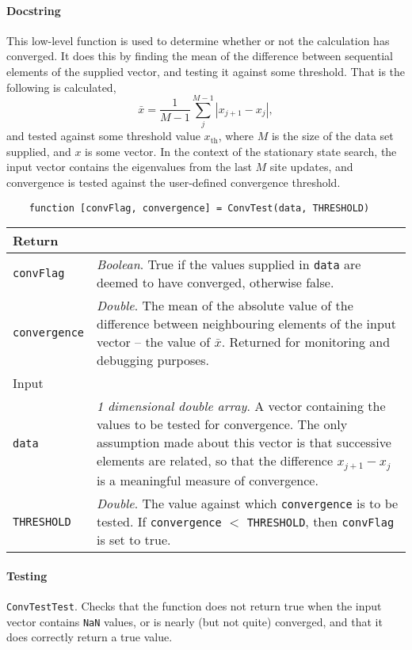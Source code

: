  \paragraph{Docstring} This low-level function is used to determine whether or not the calculation has converged. It does this by finding the mean of the difference between sequential elements of the supplied vector, and testing it against some threshold. That is the following is calculated, 
 \begin{equation}
 	\bar{x} = \frac{1}{M-1} \sum_{j}^{M-1} | x_{j+1} - x_{j} |,
 \end{equation}
 and tested against some threshold value \(x_{\mathrm{th}}\), where \(M\) is the size of the data set supplied, and \(x\) is some vector. In the context of the stationary state search, the input vector contains the eigenvalues from the last \(M\) site updates, and convergence is tested against the user-defined convergence threshold.
 \begin{lstlisting}
 	function [convFlag, convergence] = ConvTest(data, THRESHOLD) \end{lstlisting}
 \begin{longtabu}{X[1,1]X[4,1]}
 \hline
 Return & \\ \hline
 \lstinline$convFlag$ & \emph{Boolean}. True if the values supplied in \lstinline$data$ are deemed to have converged, otherwise false. \\
 \lstinline$convergence$ & \emph{Double}. The mean of the absolute value of the difference between neighbouring elements of the input vector -- the value of \(\bar{x}\). Returned for monitoring and debugging purposes. \\ \hline
 Input & \\ \hline
 \lstinline$data$ & \emph{1 dimensional double array}. A vector containing the values to be tested for convergence. The only assumption made about this vector is that successive elements are related, so that the difference \(x_{j+1} - x_{j}\) is a meaningful measure of convergence. \\
 \lstinline$THRESHOLD$ & \emph{Double}. The value against which \lstinline$convergence$ is to be tested. If \lstinline$convergence$ \(<\) \lstinline$THRESHOLD$, then \lstinline$convFlag$ is set to true. \\ 
 \hline
 \end{longtabu}
 \paragraph{Testing} \lstinline$ConvTestTest$. Checks that the function does not return true when the input vector contains \lstinline$NaN$ values, or is nearly (but not quite) converged, and that it does correctly return a true value.
  
